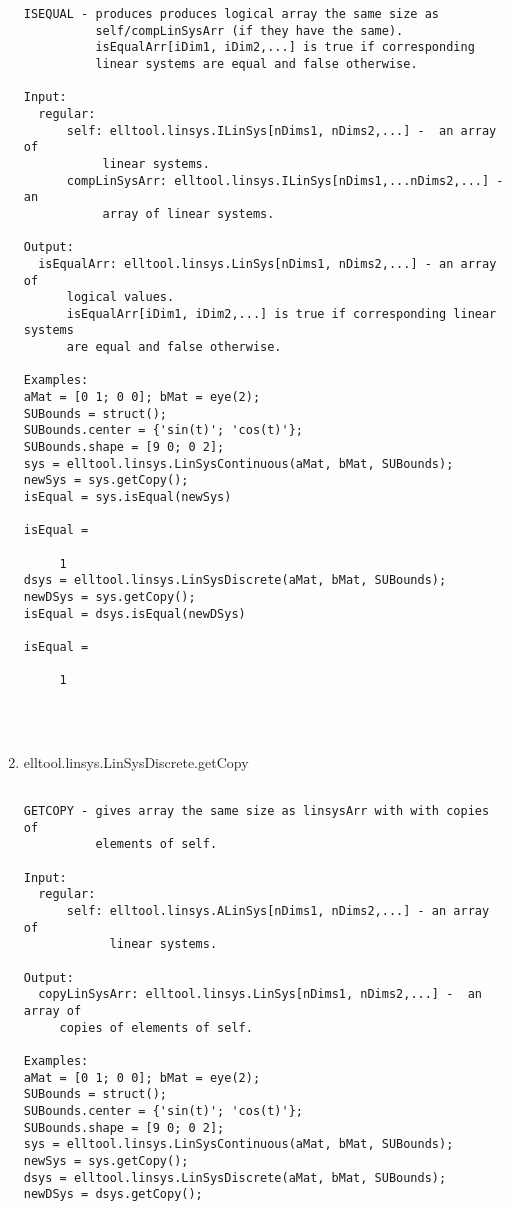 \begin{enumerate}
\begin{lstlisting}
ISEQUAL - produces produces logical array the same size as
          self/compLinSysArr (if they have the same).
          isEqualArr[iDim1, iDim2,...] is true if corresponding
          linear systems are equal and false otherwise.

Input:
  regular:
      self: elltool.linsys.ILinSys[nDims1, nDims2,...] -  an array of
           linear systems.
      compLinSysArr: elltool.linsys.ILinSys[nDims1,...nDims2,...] - an
           array of linear systems.

Output:
  isEqualArr: elltool.linsys.LinSys[nDims1, nDims2,...] - an array of
      logical values.
      isEqualArr[iDim1, iDim2,...] is true if corresponding linear systems
      are equal and false otherwise.

Examples:
aMat = [0 1; 0 0]; bMat = eye(2);
SUBounds = struct();
SUBounds.center = {'sin(t)'; 'cos(t)'};
SUBounds.shape = [9 0; 0 2];
sys = elltool.linsys.LinSysContinuous(aMat, bMat, SUBounds);
newSys = sys.getCopy();
isEqual = sys.isEqual(newSys)

isEqual =

     1
dsys = elltool.linsys.LinSysDiscrete(aMat, bMat, SUBounds);
newDSys = sys.getCopy();
isEqual = dsys.isEqual(newDSys)

isEqual =

     1




\end{lstlisting}
\fontfamily{\familydefault}
\selectfont
\item {elltool.linsys.LinSysDiscrete.getCopy}
\selectfont
\begin{lstlisting}

GETCOPY - gives array the same size as linsysArr with with copies of
          elements of self.

Input:
  regular:
      self: elltool.linsys.ALinSys[nDims1, nDims2,...] - an array of
            linear systems.

Output:
  copyLinSysArr: elltool.linsys.LinSys[nDims1, nDims2,...] -  an array of
     copies of elements of self.

Examples:
aMat = [0 1; 0 0]; bMat = eye(2);
SUBounds = struct();
SUBounds.center = {'sin(t)'; 'cos(t)'};
SUBounds.shape = [9 0; 0 2];
sys = elltool.linsys.LinSysContinuous(aMat, bMat, SUBounds);
newSys = sys.getCopy();
dsys = elltool.linsys.LinSysDiscrete(aMat, bMat, SUBounds);
newDSys = dsys.getCopy();






\end{lstlisting}
\end{enumerate}
